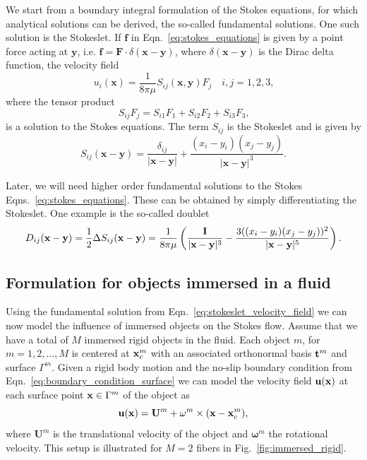 We start from a boundary integral formulation of the Stokes equations, for which analytical solutions can be derived, the so-called fundamental solutions. One such solution is the Stokeslet. If $\mathbf{f}$ in Eqn.~\eqref{eq:stokes_equations} is given by a point force acting at $\mathbf{y}$, i.e. $\mathbf{f} = \mathbf{F} \cdot \delta(\mathbf{x} - \mathbf{y})$, where $\delta(\mathbf{x} - \mathbf{y})$ is the Dirac delta function, the velocity field
\begin{equation}
  \label{eq:stokeslet_velocity_field}
  u_i(\mathbf{x}) = \frac{1}{8\pi\mu}S_{ij}(\mathbf{x},\mathbf{y})F_j \quad i,j=1,2,3 \text{,}
\end{equation}
where the tensor product
\begin{equation}
  \label{eq:stokeslet_tensor_product}
  S_{ij}F_j = S_{i1}F_1 + S_{i2}F_2 + S_{i3}F_3 \text{,}
\end{equation}
is a solution to the Stokes equations. The term $S_{ij}$ is the Stokeslet and is given by
\begin{equation}
  \label{eq:stokeslet_stokeslet}
  S_{ij}(\mathbf{x} - \mathbf{y}) = \frac{\delta_{ij}}{|\mathbf{x}-\mathbf{y}|} + \frac{(x_i - y_i)(x_j-y_j)}{|\mathbf{x}-\mathbf{y}|^3}\text{.}
\end{equation}

Later, we will need higher order fundamental solutions to the Stokes Eqns.~\eqref{eq:stokes_equations}. These can be obtained by simply differentiating the Stokeslet. One example is the so-called doublet
\begin{equation}
  \label{eq:doublet}
  D_{ij}(\mathbf{x} - \mathbf{y}) = \frac{1}{2} \Delta S_{ij}(\mathbf{x} - \mathbf{y}) = \frac{1}{8\pi\mu} \left( \frac{\mathbf{I}}{|\mathbf{x} - \mathbf{y}|^3} - \frac{3((x_i - y_i)(x_j-y_j))^2}{|\mathbf{x} - \mathbf{y}|^5}\right) \text{.}
\end{equation}

\subsection{Formulation for objects immersed in a fluid}
\label{subsec:formulation_objects_in_fluid}

Using the fundamental solution from Eqn.~\eqref{eq:stokeslet_velocity_field} we can now model the influence of immersed objects on the Stokes flow. Assume that we have a total of $M$ immersed rigid objects in the fluid. Each object $m$, for $m = 1,2,\dots,M$ is centered at $\mathbf{x}_c^m$ with an associated orthonormal basis $\mathbf{t}^m$ and surface $\Gamma^m$. Given a rigid body motion and the no-slip boundary condition from Eqn.~\eqref{eq:boundary_condition_surface} we can model the velocity field $\mathbf{u}(\mathbf{x})$ at each surface point $\mathbf{x} \in \Gamma^m$ of the object as
\begin{equation}
  \label{eq:rigid_body_motion}
	\mathbf{u}(\mathbf{x}) = \mathbf{U}^m + \mathbf{\omega}^m \times (\mathbf{x} - \mathbf{x}_c^m) \text{,}
\end{equation}
where $\mathbf{U}^m$ is the translational velocity of the object and $\mathbf{\omega}^m$ the rotational velocity. This setup is illustrated for $M=2$ fibers in Fig.~\ref{fig:immersed_rigid}.

